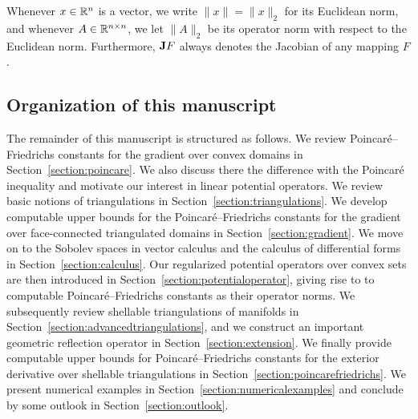 \documentclass[10pt,a4paper]{article}
\begin{document}
Whenever $x \in {\mathbb R}^{n}$ is a vector, we write $\|x\| = \|x\|_{2}$ for its Euclidean norm, 
and whenever $A \in {\mathbb R}^{n \times n}$, we let $\| A \|_{2}$ be its operator norm with respect to the Euclidean norm. 
Furthermore, ${\mathbf{J}} F$ always denotes the Jacobian of any mapping $F$. 




\subsection{Organization of this manuscript}

The remainder of this manuscript is structured as follows.
We review Poincar\'e--Friedrichs constants for the gradient over convex domains in Section~\ref{section:poincare}. 
We also discuss there the difference with the Poincar\'e inequality and motivate our interest in linear potential operators.
We review basic notions of triangulations in Section~\ref{section:triangulations}.
We develop computable upper bounds for the Poincar\'e--Friedrichs constants for the gradient over face-connected triangulated domains in Section~\ref{section:gradient}.
We move on to the Sobolev spaces in vector calculus and the calculus of differential forms in Section~\ref{section:calculus}. 
Our regularized potential operators over convex sets are then introduced in Section~\ref{section:potentialoperator}, 
giving rise to to computable Poincar\'e--Friedrichs constants as their operator norms. 
We subsequently review shellable triangulations of manifolds in Section~\ref{section:advancedtriangulations},
and we construct an important geometric reflection operator in Section~\ref{section:extension}. 
We finally provide computable upper bounds for Poincar\'e--Friedrichs constants for the exterior derivative over shellable triangulations in Section~\ref{section:poincarefriedrichs}.
We present numerical examples in Section~\ref{section:numericalexamples} and conclude by some outlook in Section~\ref{section:outlook}. 
\end{document}
